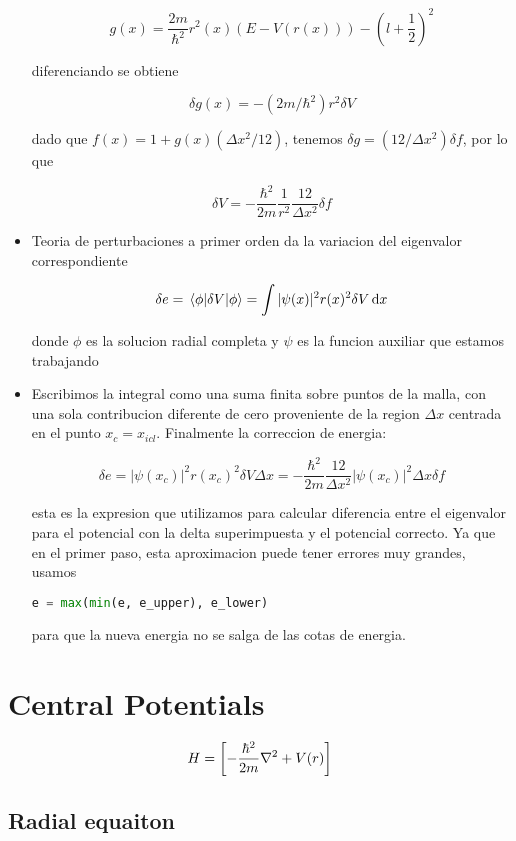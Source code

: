 \documentclass[11pt]{article}
\begin{document}
\begin{itemize}
\[ g(x) = \frac{2m}{\hbar^2}r^2(x) (E-V(r(x))) - (l+\frac{1}{2})^2 \]

diferenciando se obtiene

\[ \delta g(x) = - (2m/\hbar^2)r^2 \delta V \]

dado que \(f(x) = 1+g(x) (\Delta x^2/12)\), tenemos \(\delta g = (12/\Delta x^2) \delta f\), por lo que

\[ \delta V = - \frac{\hbar^2}{2m}\frac{1}{r^2} \frac{12}{\Delta x^2}\delta f \]

\item Teoria de perturbaciones a primer orden da la variacion del eigenvalor correspondiente

\[ \delta e = \ev{\delta V}{\phi} = \int |\psi(x)|^2r(x)^2 \delta V \dd{x} \]

donde \(\phi\) es la solucion radial completa y \(\psi\) es la funcion auxiliar que estamos trabajando

\item Escribimos la integral como una suma finita sobre puntos de la malla, con una sola contribucion diferente de cero proveniente de la region \(\Delta x\) centrada en el punto \(x_c = x_{icl}\). Finalmente la correccion de energia:

\[ \delta e = |\psi(x_c)|^2r(x_c)^2 \delta V \Delta x = - \frac{\hbar^2}{2m}\frac{12}{\Delta x^2}|\psi(x_c)|^2 \Delta x \delta f \]

esta es la expresion que utilizamos para calcular diferencia entre el eigenvalor para el potencial con la delta superimpuesta y el potencial correcto. Ya que en el primer paso, esta aproximacion puede tener errores muy grandes, usamos

\begin{lstlisting}[language=Python,numbers=none]
e = max(min(e, e_upper), e_lower)
\end{lstlisting}

para que la nueva energia no se salga de las cotas de energia.
\end{itemize}
\section{Central Potentials}
\label{sec:orgaa39a7c}

\[ H = \qty[ - \frac{\hbar^2}{2m}\nabla^2 + V(r)] \]
\subsection{Radial equaiton}
\label{sec:orgfdf4f36}
\end{document}
